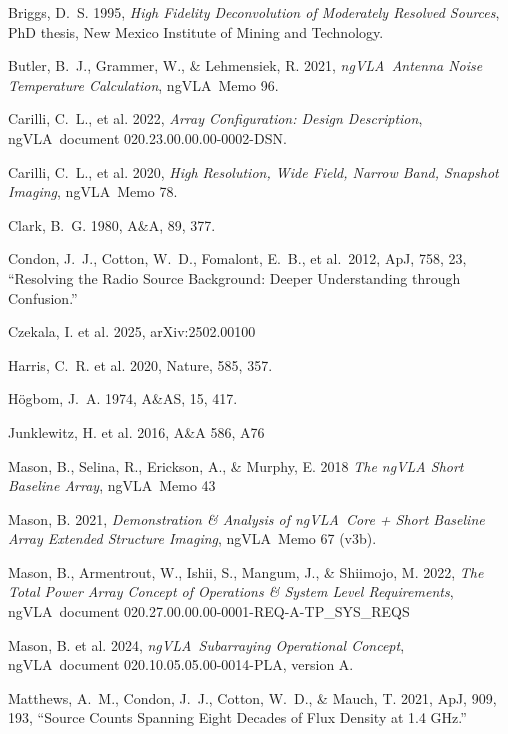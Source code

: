 \documentclass[11pt]{article}
\newcommand{\ngvla}{ngVLA}
\begin{document}
\begin{thebibliography}{}

Briggs, D.~S. 1995, {\it High Fidelity Deconvolution of Moderately
Resolved Sources}, PhD thesis, New Mexico Institute of Mining and
Technology.

Butler, B.~J., Grammer, W., \& Lehmensiek, R. 2021, {\it \ngvla\
Antenna Noise Temperature Calculation}, \ngvla\ Memo 96.

Carilli, C.~L., et al. 2022, {\it Array Configuration: Design Description},
\ngvla\ document 020.23.00.00.00-0002-DSN.

Carilli, C.~L., et al. 2020, {\it High Resolution, Wide Field, Narrow
Band, Snapshot Imaging}, \ngvla\ Memo 78.

Clark, B.~G. 1980, A\&A, 89, 377.

Condon, J.~J., Cotton, W.~D., Fomalont, E.~B., et al.\ 2012, ApJ, 758, 23,
``Resolving the Radio Source Background: Deeper Understanding through Confusion.''
  
Czekala, I. et al. 2025, arXiv:2502.00100

Harris, C.~R. et al. 2020, Nature, 585, 357.

H{\"o}gbom, J.~A. 1974, A\&AS, 15, 417.

Junklewitz, H. et al. 2016, A\&A 586, A76  

Mason, B., Selina, R., Erickson, A., \& Murphy, E. 2018 {\it The ngVLA Short Baseline Array}, \ngvla\ Memo 43
  

Mason, B. 2021, {\it Demonstration \& Analysis of \ngvla\ Core + Short
Baseline Array Extended Structure Imaging}, \ngvla\ Memo 67 (v3b).

Mason, B., Armentrout, W., Ishii, S., Mangum, J., \& Shiimojo, M. 2022, {\it The Total Power Array Concept of Operations \& System Level Requirements}, \ngvla\ document 020.27.00.00.00-0001-REQ-A-TP\_SYS\_REQS

Mason, B. et al. 2024, {\it \ngvla\ Subarraying Operational Concept}, \ngvla\
document 020.10.05.05.00-0014-PLA, version A.

Matthews, A.~M., Condon, J.~J., Cotton, W.~D., \& Mauch, T. 2021, ApJ, 909, 193,
 ``Source Counts Spanning Eight Decades of Flux Density at 1.4 GHz.''


\end{thebibliography}
\end{document}
